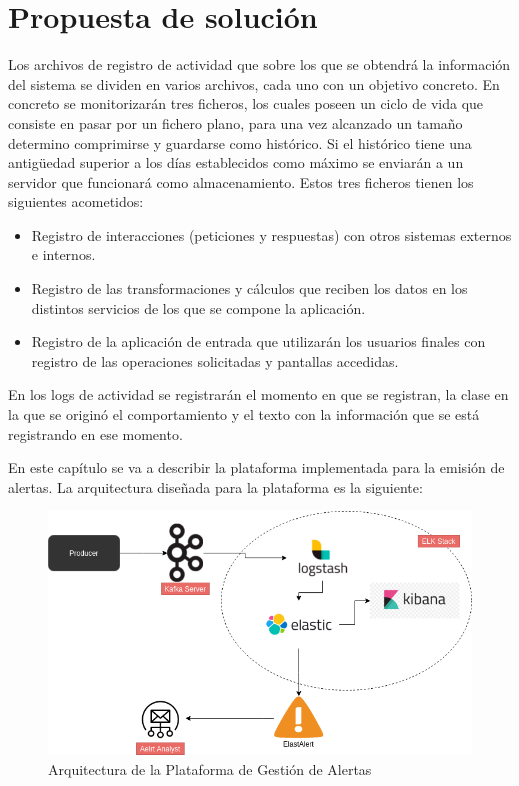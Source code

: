 \chapter{Propuesta de solución}


Los archivos de registro de actividad que sobre los que se obtendrá la información del sistema se dividen en varios archivos, cada uno con un objetivo concreto. En concreto se monitorizarán tres ficheros, los cuales poseen un ciclo de vida que consiste en pasar por un fichero plano, para una vez alcanzado un tamaño determino comprimirse y guardarse como histórico. Si el histórico tiene una antigüedad superior a los días establecidos como máximo se enviarán a un servidor que funcionará como almacenamiento. Estos tres ficheros tienen los siguientes acometidos:

\begin{itemize}
\item Registro de interacciones (peticiones y respuestas) con otros sistemas externos e internos.
\item Registro de las transformaciones y cálculos que reciben los datos en los distintos servicios de los que se compone la aplicación.
\item Registro de la aplicación de entrada que utilizarán los usuarios finales con registro de las operaciones solicitadas y pantallas accedidas.
\end{itemize}

En los logs de actividad se registrarán el momento en que se registran, la clase en la que se originó el comportamiento y el texto con la información que se está registrando en ese momento.


En este capítulo se va a describir la plataforma implementada para la emisión de alertas. La arquitectura diseñada para la plataforma es la siguiente:

\begin{figure}[H]
\centerline{\includegraphics[width=15cm]{figuras/arquitectura.png}}
\caption{Arquitectura de la Plataforma de Gestión de Alertas}
\label{enlace1}
\end{figure}

